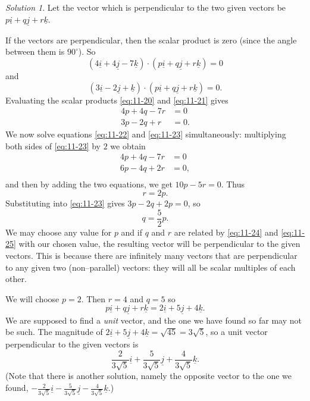 \documentclass[
  english,
  11pt,
  oneside]{book}
\theoremstyle{definition}
\theoremstyle{definition}
\theoremstyle{definition}
\theoremstyle{definition}
\theoremstyle{remark}
\newtheorem*{solution}{Solution}
\begin{document}
\begin{solution}
Let the vector which is perpendicular to the two given vectors be \(p\underline i + q\underline j + r\underline k\).

If the vectors are perpendicular, then the scalar product is zero (since the angle between them is \(90^\circ\)). So
\begin{equation}
(4\underline i + 4\underline j - 7\underline k) \cdot (p\underline i + q\underline j + r\underline k) = 0
\label{eq:11-20}
\end{equation}
and
\begin{equation}
(3\underline i - 2\underline j + \underline k) \cdot (p\underline i + q\underline j + r\underline k) = 0.
\label{eq:11-21}
\end{equation}
Evaluating the scalar products \eqref{eq:11-20} and \eqref{eq:11-21} gives
\begin{align}
4p + 4q -7r& = 0
\label{eq:11-22}\\
3p - 2q + r& = 0.
\label{eq:11-23}
\end{align}
We now solve equations \eqref{eq:11-22} and \eqref{eq:11-23} simultaneously: multiplying both sides of \eqref{eq:11-23} by \(2\) we obtain
\begin{align*}
4p + 4q - 7r& = 0\\
6p - 4q + 2r& = 0,\\
\end{align*}
and then by adding the two equations, we get \(10p - 5r = 0\). Thus
\begin{equation}
r = 2p.
\label{eq:11-24}
\end{equation}
Substituting into \eqref{eq:11-23} gives \(3p - 2q + 2p = 0\), so
\begin{equation}
q = \frac52p.
\label{eq:11-25}
\end{equation}
We may choose any value for \(p\) and if \(q\) and \(r\) are related by \eqref{eq:11-24} and \eqref{eq:11-25} with our chosen value, the resulting vector will be perpendicular to the given vectors. This is because there are infinitely many vectors that are perpendicular to any given two (non--parallel) vectors: they will all be scalar multiples of each other.

We will choose \(p = 2\). Then \(r= 4\) and \(q = 5\) so
\[p\underline i + q\underline j + r\underline k = 2\underline i + 5\underline j + 4\underline k.\]
We are supposed to find a \emph{unit} vector, and the one we have found so far may not be such. The magnitude of \(2\underline i + 5\underline j + 4\underline k = \sqrt{45} = 3\sqrt{5}\), so a unit vector perpendicular to the given vectors is
\[\frac{2}{3\sqrt{5}}\underline i+\frac{5}{3\sqrt{5}}\underline j+\frac{4}{3\sqrt{5}}\underline k.\]
(Note that there is another solution, namely the opposite vector to the one we found,
\(-\frac{2}{3\sqrt{5}}\underline i-\frac{5}{3\sqrt{5}}\underline j-\frac{4}{3\sqrt{5}}\underline k\).)
\end{solution}
\end{document}
